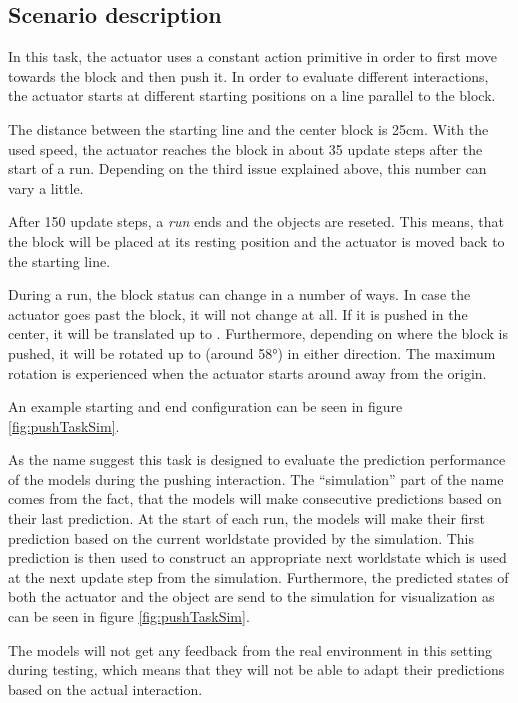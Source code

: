 \subsection{Scenario description}

In this task, the actuator uses a constant action primitive in order to first move towards the block and then push it.
In order to evaluate different interactions, the actuator starts at different starting positions on a line parallel to the block. 

The distance between the starting line and the center block is 25cm. With the used speed, the actuator reaches the block in about 35 update steps after the start of a run. Depending on the third issue explained above, this number can vary a little.

After 150 update steps, a \textit{run} ends and the objects are reseted. This means, that the block will be placed at its resting position and the actuator is moved back to the starting line. 

During a run, the block status can change in a number of ways. In case the actuator goes past the block, it will not change at all. If it is pushed in the center, it will be translated up to . Furthermore, depending on where the block is pushed, it will be rotated up to  (around 58°) in either direction. The maximum rotation is experienced when the actuator starts around  away from the origin.

An example starting and end configuration can be seen in figure \ref{fig:pushTaskSim}. 

As the name suggest this task is designed to evaluate the prediction performance of the models during the pushing interaction. The \enquote{simulation} part of the name comes from the fact, that the models will make consecutive predictions based on their last prediction. At the start of each run, the models will make their first prediction based on the current worldstate provided by the simulation. This prediction is then used to construct an appropriate next worldstate which is used at the next update step from the simulation.
Furthermore, the predicted states of both the actuator and the object are send to the simulation for visualization as can be seen in figure \ref{fig:pushTaskSim}.

The models will not get any feedback from the real environment in this setting during testing, which means that they will not be able to adapt their predictions based on the actual interaction. 

